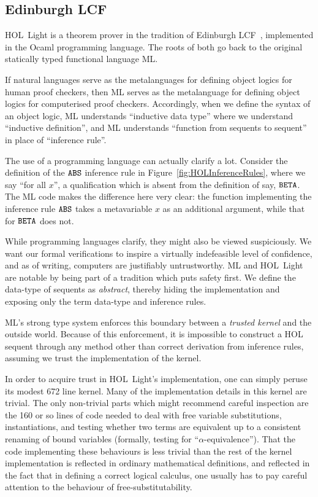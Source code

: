 \subsection{Edinburgh LCF}
HOL~Light is a theorem prover in the tradition of Edinburgh LCF~\cite{LCF}, implemented in the Ocaml programming language. The roots of both go back to the original statically typed functional language ML.

If natural languages serve as the metalanguages for defining object logics for human proof checkers, then ML serves as the metalanguage for defining object logics for computerised proof checkers. Accordingly, when we define the syntax of an object logic, ML understands ``inductive data type'' where we understand ``inductive definition'', and ML understands ``function from sequents to sequent'' in place of ``inference rule''.

The use of a programming language can actually clarify a lot. Consider the definition of the $\texttt{ABS}$ inference rule in Figure~\ref{fig:HOLInferenceRules}, where we say ``for all $x$'', a qualification which is absent from the definition of say, $\texttt{BETA}$. The ML code makes the difference here very clear: the function implementing the inference rule $\texttt{ABS}$ takes a metavariable $x$ as an additional argument, while that for $\texttt{BETA}$ does not.

While programming languages clarify, they might also be viewed suspiciously. We want our formal verifications to inspire a virtually indefeasible level of confidence, and as of writing, computers are justifiably untrustworthy. ML and HOL~Light are notable by being part of a tradition which puts safety first. We define the data-type of sequents as \emph{abstract}, thereby hiding the implementation and exposing only the term data-type and inference rules.

ML's strong type system enforces this boundary between a \emph{trusted kernel} and the outside world. Because of this enforcement, it is impossible to construct a HOL sequent through any method other than correct derivation from inference rules, assuming we trust the implementation of the kernel. 

In order to acquire trust in HOL~Light's implementation, one can simply peruse its modest 672 line kernel. Many of the implementation details in this kernel are trivial. The only non-trivial parts which might recommend careful inspection are the 160 or so lines of code needed to deal with free variable substitutions, instantiations, and testing whether two terms are equivalent up to a consistent renaming of bound variables (formally, testing for ``$\alpha$-equivalence''). That the code implementing these behaviours is less trivial than the rest of the kernel implementation is reflected in ordinary mathematical definitions, and reflected in the fact that in defining a correct logical calculus, one usually has to pay careful attention to the behaviour of free-substitutability.

